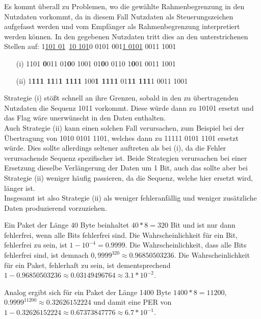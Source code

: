 \documentclass{../exercisesheet}
\begin{document}
\begin{exercise}{3}
	\begin{subexercise}
	Es kommt überall zu Problemen, wo die gewählte Rahmenbegrenzung in den Nutzdaten vorkommt, da in diesem Fall Nutzdaten als Steuerungszeichen aufgefasst werden und vom Empfänger als Rahmenbegrenzung interpretiert werden können. In den gegebenen Nutzdaten tritt dies an den unterstrichenen Stellen auf:
		1\underline{101 01}\ \underline{10 101}0 0101 001\underline{1 0101} 0011 1001
	\end{subexercise}

	\begin{subexercise}
	\begin{itemize}
	\item[(i)] 1101 \textbf{0}011 01\textbf{0}0 1001 01\textbf{0}0 0110 1\textbf{0}01 0011 1001
	\item[(ii)] 1\textbf{111 11}1\textbf{1 1111} 100\textbf{1 1111} 01\textbf{11 111}1 0011 1001
	\end{itemize}
	\end{subexercise}

	\begin{subexercise} 
		Strategie (i) stößt schnell an ihre Grenzen, sobald in den zu übertragenden Nutzdaten die Sequenz 1011 vorkommt. Diese würde dann zu 10101 ersetzt und das Flag wäre unerwünscht in den Daten enthalten.\\
		
		Auch Strategie (ii) kann einen solchen Fall verursachen, zum Beispiel bei der Übertragung von 1010 0101 1101, welches dann zu 11111 0101 1101 ersetzt würde. Dies sollte allerdings seltener auftreten als bei (i), da die Fehler verursachende Sequenz spezifischer ist. Beide Strategien verursachen bei einer Ersetzung dieselbe Verlängerung der Daten um 1 Bit, auch das sollte aber bei Strategie (ii) weniger häufig passieren, da die Sequenz, welche hier ersetzt wird, länger ist.\\
		
		Insgesamt ist also Strategie (ii) als weniger fehleranfällig und weniger zusätzliche Daten produzierend vorzuziehen.
	\end{subexercise}
\end{exercise}

\begin{exercise}{1}
	Ein Paket der Länge 40 Byte beinhaltet $40*8=320$ Bit und ist nur dann fehlerfrei, wenn alle Bits fehlerfrei sind. Die Wahrscheinlichkeit für ein Bit, fehlerfrei zu sein, ist $1-10^{-4}=0.9999$. Die Wahrscheinlichkeit, dass alle Bits fehlerfrei sind, ist demnach $0,9999^{320}\approx 0.96850503236$. Die Wahrscheinlichkeit für ein Paket, fehlerhaft zu sein, ist dementsprechend $1-0.96850503236\approx 0.03149496764\approx 3.1*10^{-2}$.
	
	Analog ergibt sich für ein Paket der Länge 1400 Byte $1400*8=11200$, $0.9999^{11200}\approx 0.32626152224$ und damit eine PER von $1-0.32626152224\approx 0.67373847776\approx
6.7*10^{-1}$.\\
\end{exercise}
\end{document}
